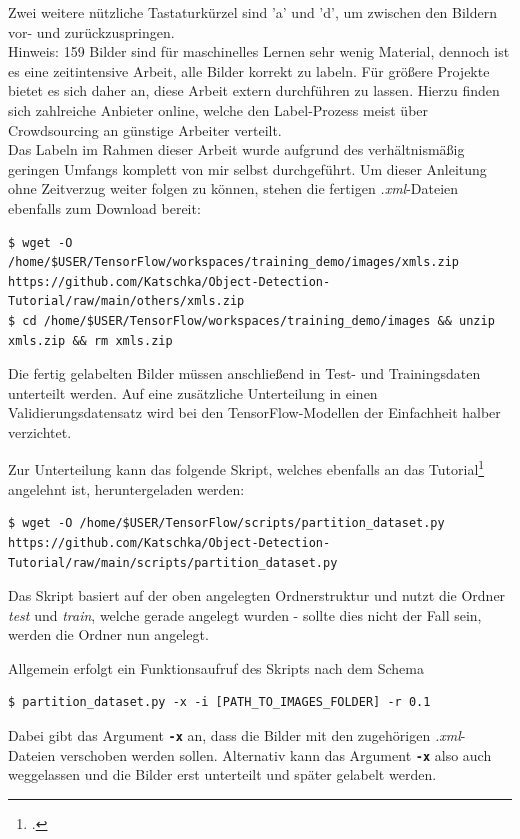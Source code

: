 \documentclass[12pt, oneside]{article}
\begin{document}
Zwei weitere nützliche Tastaturkürzel sind 'a' und 'd', um zwischen den Bildern vor- und zurückzuspringen.\\

Hinweis: 159 Bilder sind für maschinelles Lernen sehr wenig Material, dennoch ist es eine zeitintensive Arbeit, alle Bilder korrekt zu labeln. Für größere Projekte bietet es sich daher an, diese Arbeit extern durchführen zu lassen. Hierzu finden sich zahlreiche Anbieter online, welche den Label-Prozess meist über Crowdsourcing an günstige Arbeiter verteilt.\\

Das Labeln im Rahmen dieser Arbeit wurde aufgrund des verhältnismäßig geringen Umfangs komplett von mir selbst durchgeführt. Um dieser Anleitung ohne Zeitverzug weiter folgen zu können, stehen die fertigen \textit{.xml}-Dateien ebenfalls zum Download bereit:

\begin{verbatim}    
$ wget -O /home/$USER/TensorFlow/workspaces/training_demo/images/xmls.zip https://github.com/Katschka/Object-Detection-Tutorial/raw/main/others/xmls.zip
$ cd /home/$USER/TensorFlow/workspaces/training_demo/images && unzip xmls.zip && rm xmls.zip
\end{verbatim}
Die fertig gelabelten Bilder müssen anschließend in Test- und Trainingsdaten unterteilt werden. Auf eine zusätzliche Unterteilung in einen Validierungsdatensatz wird bei den TensorFlow-Modellen der Einfachheit halber verzichtet.

Zur Unterteilung kann das folgende Skript, welches ebenfalls an das Tutorial\footcite{partition_dataset} angelehnt ist, heruntergeladen werden:

\begin{verbatim}
$ wget -O /home/$USER/TensorFlow/scripts/partition_dataset.py https://github.com/Katschka/Object-Detection-Tutorial/raw/main/scripts/partition_dataset.py
\end{verbatim}
Das Skript basiert auf der oben angelegten Ordnerstruktur und nutzt die Ordner \textit{test} und \textit{train}, welche gerade angelegt wurden - sollte dies nicht der Fall sein, werden die Ordner nun angelegt. 

Allgemein erfolgt ein Funktionsaufruf des Skripts nach dem Schema

\begin{verbatim}
$ partition_dataset.py -x -i [PATH_TO_IMAGES_FOLDER] -r 0.1
\end{verbatim}    
Dabei gibt das Argument \textbf{\texttt{-x}} an, dass die Bilder mit den zugehörigen \textit{.xml}-Dateien verschoben werden sollen. Alternativ kann das Argument \textbf{\texttt{-x}} also auch weggelassen und die Bilder erst unterteilt und später gelabelt werden.
\end{document}
